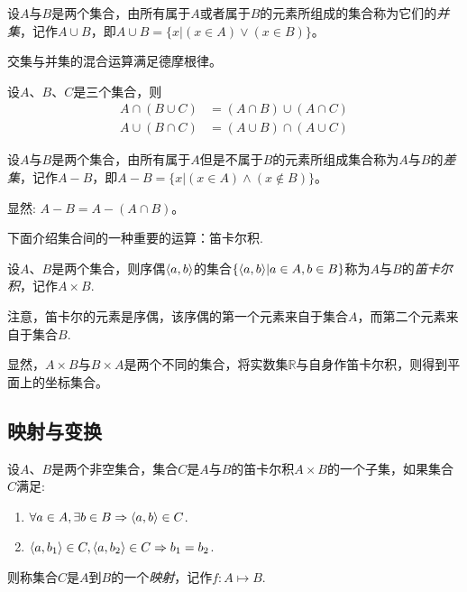 \begin{definition}
  设$A$与$B$是两个集合，由所有属于$A$或者属于$B$的元素所组成的集合称为它们的\emph{并集}，记作$A \cup B$，即$A \cup B = \{x | (x \in A) \lor (x \in B) \}$。
\end{definition}

交集与并集的混合运算满足德摩根律。
\begin{theorem}
  设$A$、$B$、$C$是三个集合，则
  \begin{align*}
    A \cap (B \cup C) & = (A \cap B) \cup (A \cap C) \\
    A \cup (B \cap C) & = (A \cup B) \cap (A \cup C)
  \end{align*}
\end{theorem}

\begin{definition}
  设$A$与$B$是两个集合，由所有属于$A$但是不属于$B$的元素所组成集合称为$A$与$B$的\emph{差集}，记作$A-B$，即$A-B = \{x | (x \in A) \land (x \notin B) \}$。
\end{definition}

显然: $A-B = A - (A \cap B)$。

下面介绍集合间的一种重要的运算：笛卡尔积.
\begin{definition}
  设$A$、$B$是两个集合，则序偶$\langle a, b \rangle$的集合$\{ \langle a, b \rangle | a \in A, b \in B \}$称为$A$与$B$的\emph{笛卡尔积}，记作$A \times B$.
\end{definition}

注意，笛卡尔的元素是序偶，该序偶的第一个元素来自于集合$A$，而第二个元素来自于集合$B$.

显然，$A \times B$与$B \times A$是两个不同的集合，将实数集$\mathbb{R}$与自身作笛卡尔积，则得到平面上的坐标集合。

\subsection{映射与变换}
\label{sec:map-and-translation}

\begin{definition}
  设$A$、$B$是两个非空集合，集合$C$是$A$与$B$的笛卡尔积$A \times B$的一个子集，如果集合$C$满足:
  \begin{enumerate}
  \item $\forall a \in A, \exists  b \in B \Rightarrow \langle a, b \rangle \in C$.
  \item $ \langle a, b_1 \rangle \in C, \langle a, b_2 \rangle \in C \Rightarrow b_1=b_2$.
  \end{enumerate}
  则称集合$C$是$A$到$B$的一个\emph{映射}，记作$f:A \mapsto B$.
\end{definition}

